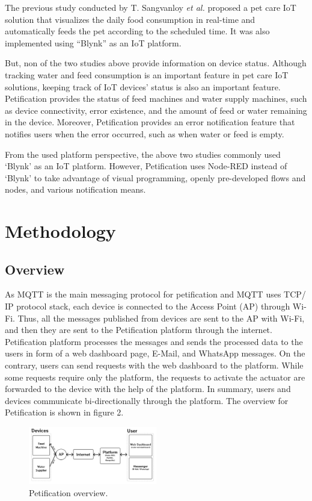 \documentclass[conference]{IEEEtran}
\begin{document}
The previous study conducted by T. Sangvanloy \textit{et al.} \cite{b4} 
proposed a pet care IoT solution that visualizes the daily food consumption in real-time and automatically feeds the pet according to the scheduled time. It was also implemented using “Blynk” as an IoT platform.

But, non of the two studies above provide information on device status. Although tracking water and feed consumption is an important feature in pet care IoT solutions, keeping track of IoT devices’ status is also an important feature. Petification provides the status of feed machines and water supply machines, such as device connectivity, error existence, and the amount of feed or water remaining in the device. Moreover, Petification provides an error notification feature that notifies users when the error occurred, such as when water or feed is empty.

From the used platform perspective, the above two studies commonly used ‘Blynk’ as an IoT platform. However, Petification uses Node-RED instead of ‘Blynk’ to take advantage of visual programming, openly pre-developed flows and nodes, and various notification means.

\section{Methodology}
\subsection{Overview}
As MQTT is the main messaging protocol for petification and MQTT uses TCP/ IP protocol stack, each device is connected to the Access Point (AP) through Wi-Fi. Thus, all the messages published from devices are sent to the AP with Wi-Fi, and then they are sent to the Petification platform through the internet. Petification platform processes the messages and sends the processed data to the users in form of a web dashboard page, E-Mail, and WhatsApp messages. On the contrary, users can send requests with the web dashboard to the platform. While some requests require only the platform, the requests to activate the actuator are forwarded to the device with the help of the platform. In summary, users and devices communicate bi-directionally through the platform. The overview for Petification is shown in figure 2.

\begin{figure}[htbp]
\centerline{\includegraphics[width=0.5\textwidth]{./images/Overview.png}}
\caption{Petification overview.}
\label{fig}
\end{figure}
\end{document}
